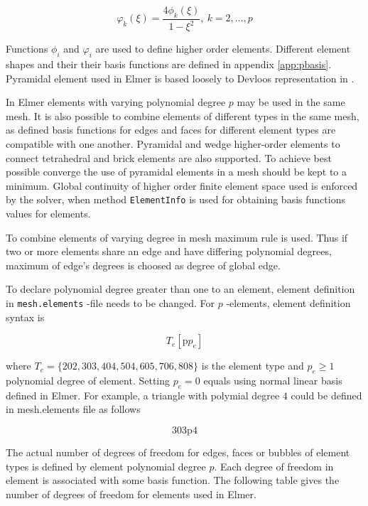 \begin{equation}
\varphi_k(\xi)=\frac{4\phi_k(\xi)}{1-\xi^2},\ k=2,\ldots,p
\end{equation}

\noindent Functions $\phi_i$ and $\varphi_i$ are used to define higher order elements. Different element shapes and their their basis functions are defined in appendix \ref{app:pbasis}. Pyramidal element used in Elmer is based loosely to Devloos representation in \cite{Devloo}. 

In Elmer elements with varying polynomial degree $p$ may be used in the same mesh. It is also possible to combine elements of different types in the same mesh, as defined basis functions for edges and faces for different element types are compatible with one another. Pyramidal and wedge higher-order elements to connect tetrahedral and brick elements are also supported. To achieve best possible converge the use of pyramidal elements in a mesh should be kept to a minimum. Global continuity of higher order finite element space used is enforced by the solver, when method \texttt{ElementInfo} is used for obtaining basis functions values for elements.  

To combine elements of varying degree in mesh maximum rule is used. Thus if two or more elements share an edge and have differing polynomial degrees, maximum of edge's degrees is choosed as degree of global edge. 

To declare polynomial degree greater than one to an element, element definition in \texttt{mesh.elements} -file needs to be changed. For $p$ -elements, element definition syntax is 

\[
T_e[\mbox{p}p_e]
\]

\noindent where $T_e=\{202,303,404,504,605,706,808\}$ is the element type and $p_e\geq 1$ polynomial degree of element. Setting $p_e=0$ equals using normal linear basis defined in Elmer. For example, a triangle with polymial degree $4$ could be defined in mesh.elements file as follows

\[
303\mbox{p}4
\]

The actual number of degrees of freedom for edges, faces or bubbles of element types is defined by element polynomial degree $p$. Each degree of freedom in element is associated with some basis function. The following table gives the number of degrees of freedom for elements used in Elmer.  

